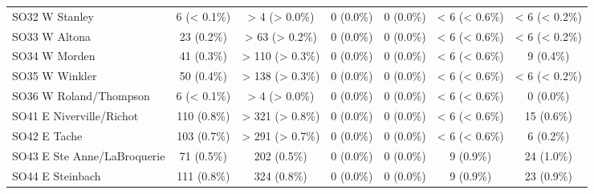 \documentclass{article}
\begin{document}
\begin{table}[htbp]
\begin{tabular}{l*{6}{c}}
  SO32 W Stanley                                        &           6 (< 0.1\%)           &          > 4 (> 0.0\%)          &            0 (0.0\%)            &            0 (0.0\%)            &          < 6 (< 0.6\%)          &          < 6 (< 0.2\%)          \\
  SO33 W Altona                                         &            23 (0.2\%)           &          > 63 (> 0.2\%)         &            0 (0.0\%)            &            0 (0.0\%)            &          < 6 (< 0.6\%)          &          < 6 (< 0.2\%)          \\
  SO34 W Morden                                         &            41 (0.3\%)           &         > 110 (> 0.3\%)         &            0 (0.0\%)            &            0 (0.0\%)            &          < 6 (< 0.6\%)          &            9 (0.4\%)            \\
  SO35 W Winkler                                        &            50 (0.4\%)           &         > 138 (> 0.3\%)         &            0 (0.0\%)            &            0 (0.0\%)            &          < 6 (< 0.6\%)          &          < 6 (< 0.2\%)          \\
  SO36 W Roland/Thompson                                &           6 (< 0.1\%)           &          > 4 (> 0.0\%)          &            0 (0.0\%)            &            0 (0.0\%)            &          < 6 (< 0.6\%)          &            0 (0.0\%)            \\
  SO41 E Niverville/Richot                              &           110 (0.8\%)           &         > 321 (> 0.8\%)         &            0 (0.0\%)            &            0 (0.0\%)            &          < 6 (< 0.6\%)          &            15 (0.6\%)           \\
  SO42 E Tache                                          &           103 (0.7\%)           &         > 291 (> 0.7\%)         &            0 (0.0\%)            &            0 (0.0\%)            &          < 6 (< 0.6\%)          &            6 (0.2\%)            \\
  SO43 E Ste Anne/LaBroquerie                           &            71 (0.5\%)           &           202 (0.5\%)           &            0 (0.0\%)            &            0 (0.0\%)            &            9 (0.9\%)            &            24 (1.0\%)           \\
  SO44 E Steinbach                                      &           111 (0.8\%)           &           324 (0.8\%)           &            0 (0.0\%)            &            0 (0.0\%)            &            9 (0.9\%)            &            23 (0.9\%)           \\

\end{tabular}
\end{table}
\end{document}
